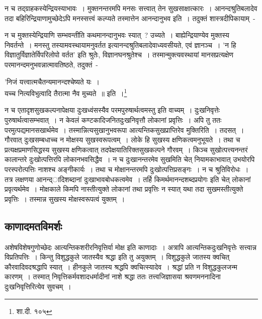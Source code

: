 		न च तद्ग्राहकस्येन्द्रियस्याभावः~। मुक्तनन्तरमपि मनसः सत्त्वात् तेन सुखसाक्षात्कारः~। आनन्दश्रुतिबलादेव तदा बहिरिन्द्रियाणामुच्छेदेऽपि मनस्सत्त्वं कल्प्यते तस्मात्तेन आनन्दानुभव इति~। तदुक्तं शास्त्रदीपिकायाम्~- {\fontsize{11.7}{0}\selectfont\s  न च मुक्तस्येन्द्रियाणि सम्भवन्तीति कथमानन्दानुभवः स्यात्~? उच्यते~। बाह्येन्द्रियाण्येव मुक्तस्य निवर्तन्ते~। मनस्तु तस्यामवस्थायामनुवर्तत इत्यानन्दश्रुतिबलादेवाध्यवसीयते, एवं ज्ञानञ्च~। 'न हि विज्ञातुर्विज्ञातेर्विपरिलोपो वर्तत' इति श्रुतेः, विज्ञानघनश्रुतेश्च~। तस्मान्मुक्त्यवस्थायां मानसप्रत्यक्षेण परमानन्दमनुभवन्नात्मावतिष्ठते, तदुक्तं~-\\ \begin{center}'निजं यत्त्वात्मचैतन्यमानन्दश्चेष्यते यः~।\\ यच्च नित्यविभुत्वादि तैरात्मा नैव मुच्यते~॥ इति~।\footnote{शा.दी. १०५}\end{center}}

		 न च एतादृशसुखकल्पनापेक्षया दुःखध्वंसस्यैव परमपुरुषार्थत्वमस्तु इति वाच्यम्~। दुःखनिवृत्तेः पुरुषार्थत्वासम्भवात्~। न केवलं कण्टकादिजनितदुःखनिवृत्तौ लोकानां प्रवृत्तिः~। अपि तु ततः परमुत्पद्यमानसखार्थमेव~। तस्मान्नित्यसुखानुभवरूपा आत्यन्तिकसुखप्राप्तिरेव मुक्तिरिति~। तदसत्~। गौरवात् दुःखसम्बधाच्च न मोक्षस्य सुखस्वरूपत्वम्~। लोके हि सुखस्य क्षणिकत्वमनुभूयते~। तथा च प्रत्यक्षप्रमाणसिद्धस्य सुखस्य क्षणिकत्वात् तदपेक्षयातिरिक्तसुखकल्पने गौरवम्~। किञ्च सुखोत्पत्त्यनन्तरं कालान्तरे दुःखोत्पत्तिरपि लोकानभवसिद्धैव~। न च दुःखानन्तरमेव सुखमिति चेत् नियामकाभावात् उभयोरपि परस्परोत्पत्तिः नाशश्च अङ्गीकार्यः~। तथा च मोक्षानन्तरमपि दुःखोत्पत्तिप्रसङ्गः~। न च श्रुतिविरोधः~। तत्र लक्षणया आनन्द्ादिशब्दानां दुःखाभावबोधकत्वमेव~। तर्हि किमर्थमानन्दशब्दप्रयोगः इति चेत् लोकानां प्रवृत्यर्थमेव~। मोक्षकाले किमपि नास्तीत्युक्ते लोकानां तथा प्रवृत्तिः न स्यात् यथा तदा सुखमस्तीत्युक्ते प्रवृत्तिः~। तस्मान्न सुखस्य मोक्षस्वरूपत्वं युक्तम्~।

		\subsection{काणादमतविमर्शः}

		अशेषविशेषगुणोच्छेदः आत्यन्तिकशरीरनिवृत्तिर्वा मोक्ष इति काणादाः~। अत्रापि आत्यन्तिकदुःखनिवृत्तेः सत्त्वान्न विप्रतिपत्तिः~। किन्तु विशुद्धकुले जातस्यैव श्रद्धा इति तु अयुक्तम्~। विशुद्धकुले जातस्य क्वचित् कौरवादिवदश्रद्धापि स्यात्~। हीनकुले जातस्य श्रद्धपि क्वचित्स्यादेव~। श्रद्धां प्रति न विशुद्धकुलजन्म कारणम्~। तस्मात् निवृत्तिकर्मवशादधर्मादीनां नाशे श्रद्धा ततः तत्त्वजिज्ञासया श्रवणमननादिना दुःखनिवृत्तिरित्येव सुवचम्~।

